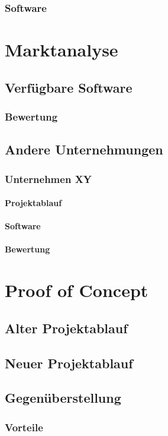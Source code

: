 \documentclass[
11pt, %
a4paper, %
BCOR25mm, %
DIV14, %
footsepline = false, %
headsepline, %
twoside, %
openright,
abstracton, %
listof=totocnumbered, %
bibliography=totocnumbered %
]{scrreprt}
\begin{document}
  \subsection{Software}
  
  \chapter{Marktanalyse}
  \section{Verfügbare Software}
  \subsection{Bewertung}
  \section{Andere Unternehmungen}
  \subsection{Unternehmen XY}
  \subsubsection{Projektablauf}
  \subsubsection{Software}
  \subsubsection{Bewertung}
  
  \chapter{Proof of Concept}
  \section{Alter Projektablauf}
  \section{Neuer Projektablauf}
  \section{Gegenüberstellung}
  \subsection{Vorteile}
\end{document}
